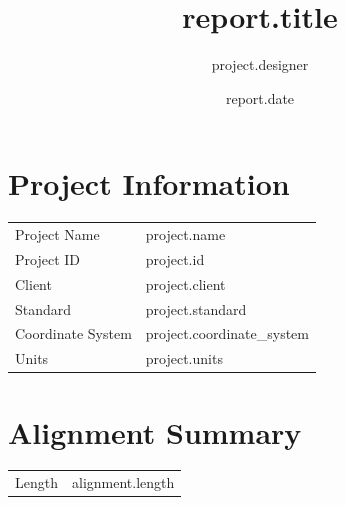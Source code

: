 \documentclass[11pt,a4paper]{article}
\title{ {{ report.title }} }
\author{ {{ project.designer }} }
\date{ {{ report.date }} }
\begin{document}
\maketitle

\tableofcontents

\newpage


{%

\section{Project Information}

\begin{tabular}{ll}

Project Name &
{{ project.name }}

\\

Project ID &
{{ project.id }}

\\

Client &
{{ project.client }}

\\

Standard &
{{ project.standard }}

\\

Coordinate System &
{{ project.coordinate_system }}

\\

Units &
{{ project.units }}

\\

\end{tabular}

{%


{%

\section{Alignment Summary}

\begin{tabular}{ll}

Length &
{{ alignment.length }}


\end{tabular}}}}
\end{document}
